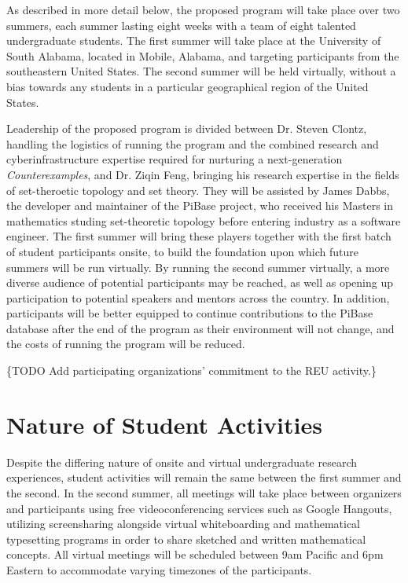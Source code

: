   As described in more detail below, the proposed program will take place
  over two summers, each summer lasting eight weeks
  with a team of eight talented undergraduate
  students. The first summer will take place at the University of South
  Alabama, located in Mobile, Alabama, and targeting participants from
  the southeastern United States. The second summer will be held
  virtually, without a bias towards any students in a particular geographical
  region of the United States.

  Leadership of the proposed program is divided between Dr. Steven Clontz,
  handling the logistics of running the program and the combined
  research and cyberinfrastructure
  expertise required for nurturing a next-generation \textit{Counterexamples},
  and Dr. Ziqin Feng, bringing his research expertise in the fields of set-theroetic
  topology and set theory. They will be assisted by James Dabbs, the
  developer and maintainer of the PiBase project, who received his Masters
  in mathematics studing set-theoretic topology before entering industry as
  a software engineer. The first summer will bring these players together
  with the first batch of student participants onsite, to build the foundation
  upon which future summers will be run virtually. By running the second
  summer virtually, a more diverse audience of potential participants may
  be reached, as well as opening up participation to potential speakers and
  mentors across the country. In addition, participants will be better equipped
  to continue contributions
  to the PiBase database after the end of the program as their environment
  will not change, and the costs of running the program will be reduced.

  \{TODO Add participating organizations'
  commitment to the REU activity.\}

\section{Nature of Student Activities}

Despite the differing nature of onsite and virtual undergraduate research
experiences, student activities will remain the same between the first summer
and the second. In the second summer, all meetings will take place
between organizers and participants using free videoconferencing services
such as Google Hangouts, utilizing screensharing alongside virtual whiteboarding
and mathematical typesetting programs in order to share sketched and written
mathematical concepts. All virtual meetings will be scheduled between
9am Pacific and 6pm Eastern to accommodate varying timezones of the participants.


